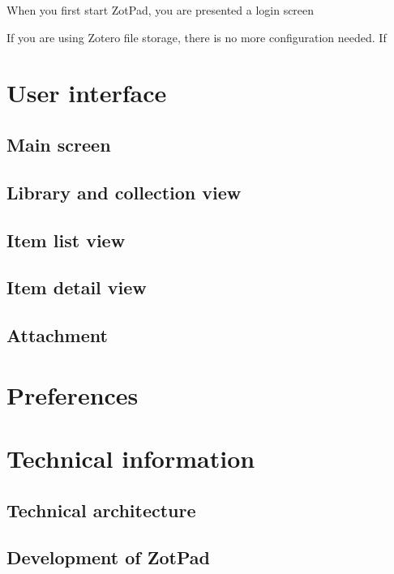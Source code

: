 \documentclass{tufte-book}
\begin{document}
When you first start ZotPad, you are presented a login screen

If you are using Zotero file storage, there is no more configuration needed. If


\chapter{User interface}

	\section{Main screen}

	\section{Library and collection view}

	\section{Item list view}

	\section{Item detail view}

	\section{Attachment}

\chapter{Preferences}

\chapter{Technical information}

	\section{Technical architecture}

	\section{Development of ZotPad}
	
\end{document}
